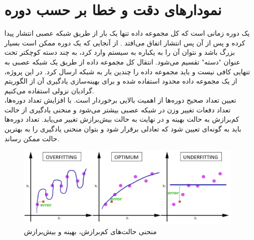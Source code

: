 



\section[نمودار‌های دقت و خطا بر حسب دوره]{ نمودار‌های دقت و خطا بر حسب دوره }
یک دوره زمانی است که کل مجموعه داده تنها یک بار از طریق شبکه عصبی انتشار پیدا کرده و پس از آن پس انتشار اتفاق می‌افتد
. از آنجایی که یک دوره ممکن است بسیار بزرگ باشد و نتوان آن را به یکباره به سیستم وارد کرد، به چند دسته کوچکتر تحت عنوان "دسته" تقسیم می‌شود. انتقال کل مجموعه داده از طریق یک شبکه عصبی به تنهایی کافی نیست و باید مجموعه داده را چندین بار به شبکه ارسال کرد. در این پروژه، از یک مجموعه داده محدود استفاده شده و برای بهینه‌سازی یادگیری آن از الگوریتم گرادیان نزولی استفاده می‌کنیم.
\\
تعیین تعداد صحیح دوره‌ها از اهمیت بالایی برخوردار است. با افزایش تعداد دوره‌ها،‌ تعداد دفعات تغییر وزن در شبکه عصبی بیشتر می‌شود و منحنی یادگیری از حالت کم‌برازش به حالت بهینه و در نهایت به حالت بیش‌برازش تغییر می‌یابد. تعداد دوره‌ها باید به گونه‌ای تعیین شود که تعادلی برقرار شود و بتوان منحنی یادگیری را به بهترین حالت ممکن رساند.\\



\begin{figure}[h]
    \centering
    \includegraphics[width=1\textwidth]{fitting.png}
    \caption[منحنی‌ حالت‌های کم‌برازش، بهینه و بیش‌برازش]{منحنی‌ حالت‌های کم‌برازش، بهینه و بیش‌برازش \cite{wwwreddi92:online}}
\end{figure}


